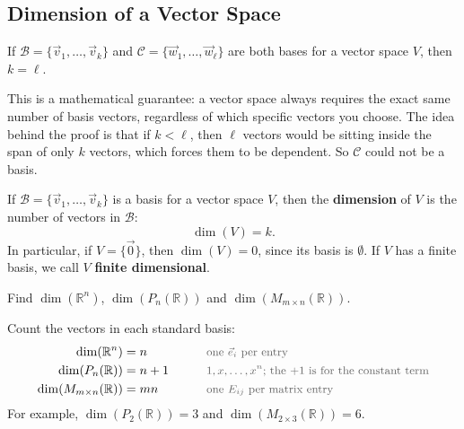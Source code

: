 \subsection{Dimension of a Vector Space}

\begin{theorem}
If $\mathcal{B} = \{\vec{v}_1, \dots, \vec{v}_k\}$ and $\mathcal{C} = \{\vec{w}_1, \dots, \vec{w}_\ell\}$ are both bases for a vector space $V$, then $k = \ell$.
\end{theorem}

\begin{remark}
This is a mathematical guarantee: a vector space always requires the exact same number of basis vectors, regardless of which specific vectors you choose. The idea behind the proof is that if $k < \ell$, then $\ell$ vectors would be sitting inside the span of only $k$ vectors, which forces them to be dependent. So $\mathcal{C}$ could not be a basis.
\end{remark}

\begin{definition}[Dimension]
If $\mathcal{B} = \{\vec{v}_1, \dots, \vec{v}_k\}$ is a basis for a vector space $V$, then the \textbf{dimension} of $V$ is the number of vectors in $\mathcal{B}$:
\[
\dim(V) = k.
\]
In particular, if $V = \{\vec{0}\}$, then $\dim(V) = 0$, since its basis is $\emptyset$. If $V$ has a finite basis, we call $V$ \textbf{finite dimensional}.
\end{definition}

\begin{example}
Find $\dim(\mathbb{R}^n)$, $\dim(P_n(\mathbb{R}))$ and $\dim(M_{m \times n}(\mathbb{R}))$.

\begin{solution}
Count the vectors in each standard basis:
\begin{alignat*}{2}
\dim(\mathbb{R}^n) &= n &\qquad& \by{one $\vec{e}_i$ per entry} \\
\dim(P_n(\mathbb{R})) &= n + 1 && \by{$1, x, \dots, x^n$; the $+1$ is for the constant term} \\
\dim(M_{m \times n}(\mathbb{R})) &= mn && \by{one $E_{ij}$ per matrix entry}
\end{alignat*}
For example, $\dim(P_2(\mathbb{R})) = 3$ and $\dim(M_{2 \times 3}(\mathbb{R})) = 6$.
\end{solution}
\end{example}

